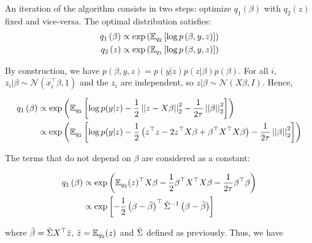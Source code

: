 \documentclass[a4paper, 11pt]{article}
\begin{document}
\begin{enumerate}
    An iteration of the algorithm consists in two steps: optimize $q_1 \left( \beta \right)$ with $q_2 \left( z \right)$ fixed and vice-versa. The optimal distribution satisfies:
    \begin{equation*}
        \begin{aligned}
        q_1 \left( \beta \right) &\propto \exp \left( \mathbb{E}_{q_2} \left[ \log p \left( \beta, y, z \right) \right] \right) \\
        q_2 \left( z \right) &\propto \exp \left( \mathbb{E}_{q_1} \left[ \log p \left( \beta, y, z \right) \right] \right)
        \end{aligned}
    \end{equation*}
    
    By construction, we have $p \left( \beta, y, z \right) = p \left( y | z \right) p \left( z | \beta \right) p \left( \beta \right)$. For all $i$, $z_i | \beta \sim \mathcal{N} \left( x_i^\top \beta, 1 \right)$ and the $z_i$ are independent, so $z | \beta \sim \mathcal{N} \left( X \beta, I \right)$. Hence,
    
    \begin{equation*}
        \begin{aligned}
        q_1 \left( \beta \right) &\propto \exp \left( \mathbb{E}_{q_2} \left[ \log p ( y | z ) - \frac{1}{2} \left|\left| z - X \beta \right|\right|_{2}^{2} - \frac{1}{2 \tau} \left|\left| \beta \right|\right|_{2}^{2} \right] \right) \\
        &\propto \exp \left( \mathbb{E}_{q_2} \left[ \log p ( y | z ) - \frac{1}{2} \left( z^\top z - 2 z^\top X \beta + \beta^\top X^\top X \beta \right) - \frac{1}{2 \tau} \left|\left| \beta \right|\right|_{2}^{2} \right] \right)
        \end{aligned}
    \end{equation*}
    
    The terms that do not depend on $\beta$ are considered as a constant:
    
    \begin{equation*}
        \begin{aligned}
        q_1 \left( \beta \right) &\propto \exp \left( \mathbb{E}_{q_2}(z)^\top X \beta - \frac{1}{2} \beta^\top X^\top X \beta - \frac{1}{2 \tau} \beta^\top \beta \right) \\
        &\propto \exp \left[ - \frac{1}{2} \left( \beta - \bar{\beta} \right)^\top \Tilde{\Sigma}^{-1} \left( \beta - \bar{\beta} \right) \right]
        \end{aligned}
    \end{equation*}
    
    where $\bar{\beta} = \Tilde{\Sigma} X^\top \bar{z}$, $\bar{z} = \mathbb{E}_{q_2}(z)$ and $\Tilde{\Sigma}$ defined as previously. Thus, we have 
    

\end{enumerate}
\end{document}
